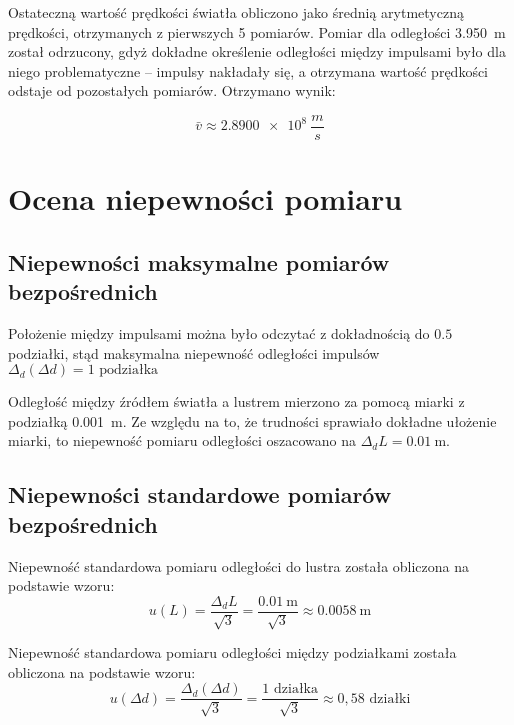 \documentclass[a4paper,12pt]{article}
\begin{document}
Ostateczną wartość prędkości światła obliczono jako średnią arytmetyczną prędkości, otrzymanych z pierwszych 5 pomiarów. Pomiar dla odległości \SI{3.950}{\meter} został odrzucony, gdyż dokładne określenie odległości między impulsami było dla niego problematyczne -- impulsy nakładały się, a otrzymana wartość prędkości odstaje od pozostałych pomiarów. Otrzymano wynik:

\begin{equation*}
    \bar{v} \approx \SI{2.8900e8}{\frac{m}{s}}
\end{equation*}


\section{Ocena niepewności pomiaru}

\subsection{Niepewności maksymalne pomiarów bezpośrednich}

Położenie między impulsami można było odczytać z dokładnością do $\num{0,5}$ podziałki, stąd maksymalna niepewność odległości impulsów $\Delta_d(\Delta d) = 1 \text{ podziałka}$

Odległość między źródłem światła a lustrem mierzono za pomocą miarki z podziałką \SI{0.001}{\meter}. Ze względu na to, że trudności sprawiało dokładne ułożenie miarki, to niepewność pomiaru odległości oszacowano na $\Delta_d L = \SI{0.01}{\meter}$.

\subsection{Niepewności standardowe pomiarów bezpośrednich}

Niepewność standardowa pomiaru odległości do lustra została obliczona na podstawie wzoru:
\begin{equation*}
    u(L) = \frac{\Delta_d L}{\sqrt{3}} = \frac{\SI{0.01}{\meter}}{\sqrt{3}} \approx \SI{0.0058}{\meter}
\end{equation*}

Niepewność standardowa pomiaru odległości między podziałkami została obliczona na podstawie wzoru:
\begin{equation*}
    u(\Delta d) = \frac{\Delta_d(\Delta d)}{\sqrt{3}} = \frac{1 \text{ działka}}{\sqrt{3}} \approx 0{,}58 \text{ działki}
\end{equation*}
\end{document}
